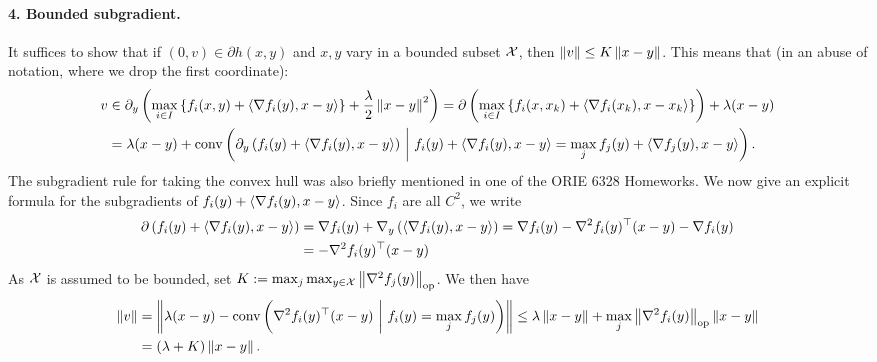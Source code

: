 \documentclass[10pt]{article}
\begin{document}
\begin{Answer}
    \paragraph{4. Bounded subgradient.}
    It suffices to show that if $(0, v) \in \partial h(x, y)$ and $x, y$ vary
    in a bounded subset $\mathcal{X}$, then $\left \| v \right \| \leq K \left \| x - y \right \|$. This
    means that (in an abuse of notation, where we drop the first coordinate):
    \begin{align*}
        v & \in \partial_y \left(\max_{i \in I} \left\{   f_i(x, y) + \left\langle \nabla
        f_i(y),x - y \right\rangle  \right\} + \frac{\lambda}{2} \left \| x - y \right \|^2 \right)
        = \partial \left(
        \max_{i \in I} \left\{   f_i(x, x_k) + \left\langle \nabla
            f_i(x_k),x - x_k \right\rangle  \right\}
        \right) + \lambda (x - y) \\
        &= \lambda (x - y) + \mathrm{conv}\left(
            \partial_y \left( f_i (y) + \left\langle \nabla f_i(y), x - y \right\rangle \right)
            \ \middle| \  f_i(y) + \left\langle \nabla f_i(y), x - y \right\rangle = \max_j
                f_j(y) + \left\langle \nabla f_j(y), x - y \right\rangle\right).
    \end{align*}
    The subgradient rule for taking the convex hull was also briefly mentioned
    in one of the ORIE 6328 Homeworks. We now give an explicit formula for the
    subgradients of $f_i(y) + \left\langle \nabla f_i(y), x - y \right\rangle$. Since $f_i$ are all
    $C^2$, we write
    \begin{align*}
        \partial \left( f_i(y) + \left\langle \nabla f_i(y), x - y \right\rangle \right) &=
        \nabla f_i(y) + \nabla_y \left( \left\langle \nabla f_i(y), x - y \right\rangle \right)
        = \nabla f_i(y) - \nabla^2 f_i(y)^\top (x - y) - \nabla f_i(y) \\
        &= -\nabla^2 f_i(y)^\top (x - y)
    \end{align*}
    As $\mathcal{X}$ is assumed to be bounded, set $K := \max_j \max_{y \in \mathcal{X}}
    \left \|  \nabla^2 f_j(y)  \right \|_{\mathrm{op}}$. We then have
    \begin{align*}
        \left \| v \right \| &= \left \| \lambda(x - y) - \mathrm{conv}
        \left( \nabla^2 f_i(y)^\top (x - y) \ \middle| \  f_i(y) = \max_j f_j(y)
        \right) \right \|
        \leq \lambda \left \| x - y \right \| + \max_j \left \|  \nabla^2 f_i(y)  \right \|_{\mathrm{op}}
        \left \| x - y \right \| \\
        &= \left( \lambda + K \right)\left \| x - y \right \|.
    \end{align*}


\end{Answer}
\end{document}

